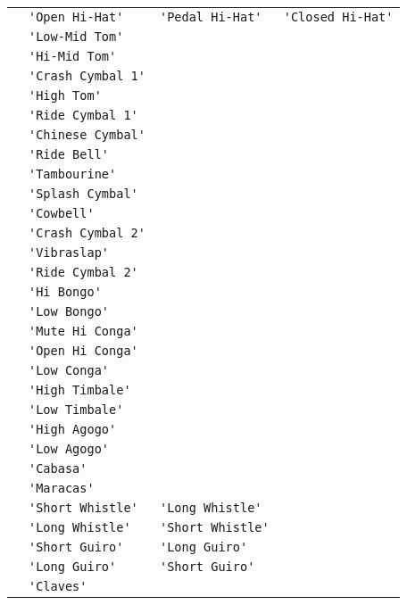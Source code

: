 \documentclass{article}
\newcommand\lvlo{}
\begin{document}
\begin{center}
\begin{longtable}{llll}
 \lvlo & \lstinline!'Open Hi-Hat'! & \lstinline!'Pedal Hi-Hat'! & \lstinline!'Closed Hi-Hat'! \\
 \lvlo & \lstinline!'Low-Mid Tom'! & & \\
 \lvlo & \lstinline!'Hi-Mid Tom'! & & \\
 \lvlo & \lstinline!'Crash Cymbal 1'! & & \\
 \lvlo & \lstinline!'High Tom'! & & \\
 \lvlo & \lstinline!'Ride Cymbal 1'! & & \\
 \lvlo & \lstinline!'Chinese Cymbal'! & & \\
 \lvlo & \lstinline!'Ride Bell'! & & \\
 \lvlo & \lstinline!'Tambourine'! & & \\
 \lvlo & \lstinline!'Splash Cymbal'! & & \\
 \lvlo & \lstinline!'Cowbell'! & & \\
 \lvlo & \lstinline!'Crash Cymbal 2'! & & \\
 \lvlo & \lstinline!'Vibraslap'! & & \\
 \lvlo & \lstinline!'Ride Cymbal 2'! & & \\
 \lvlo & \lstinline!'Hi Bongo'! & & \\
 \lvlo & \lstinline!'Low Bongo'! & & \\
 \lvlo & \lstinline!'Mute Hi Conga'! & & \\
 \lvlo & \lstinline!'Open Hi Conga'! & & \\
 \lvlo & \lstinline!'Low Conga'! & & \\
 \lvlo & \lstinline!'High Timbale'! & & \\
 \lvlo & \lstinline!'Low Timbale'! & & \\
 \lvlo & \lstinline!'High Agogo'! & & \\
 \lvlo & \lstinline!'Low Agogo'! & & \\
 \lvlo & \lstinline!'Cabasa'! & & \\
 \lvlo & \lstinline!'Maracas'! & & \\
 \lvlo & \lstinline!'Short Whistle'! & \lstinline!'Long Whistle'! & \\
 \lvlo & \lstinline!'Long Whistle'! & \lstinline!'Short Whistle'! & \\
 \lvlo & \lstinline!'Short Guiro'! & \lstinline!'Long Guiro'! & \\
 \lvlo & \lstinline!'Long Guiro'! & \lstinline!'Short Guiro'! & \\
 \lvlo & \lstinline!'Claves'! & & \\

\end{longtable}
\end{center}
\end{document}
